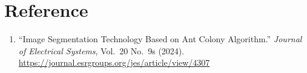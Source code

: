 \documentclass[12pt,a4paper]{article}
\begin{document}
\section{Reference}

\begin{enumerate}
    \item ``Image Segmentation Technology Based on Ant Colony Algorithm.'' \textit{Journal of Electrical Systems}, Vol.\ 20 No.\ 9s (2024).\\
    \url{https://journal.esrgroups.org/jes/article/view/4307}
\end{enumerate}
\end{document}

